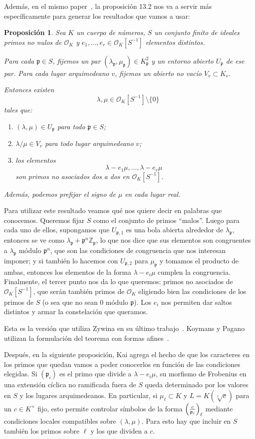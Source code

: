 \documentclass[a4paper]{book}
\theoremstyle{definition}
\theoremstyle{plain}
\newtheorem*{prop*}{Proposición}
\newcommand{\ZZ}{\mathbb{Z}}
\newcommand{\OO}{\mathcal{O}}
\newcommand{\pp}{\mathfrak{p}}
\newcommand{\lp}{\left\lparen}
\newcommand{\rp}{\right\rparen}
\begin{document}
Además, en el mismo paper~\cite{Kai2026Patrones}, la proposición 13.2 nos va a servir más específicamente para generar los resultados que vamos a usar:

\begin{prop*}
Sea $K$ un cuerpo de números, $S$ un conjunto finito de
ideales primos no nulos de $\OO_K$ y
$e_1,\ldots,e_r\in\OO_K[S^{-1}]$ elementos distintos.

Para cada $\pp\in S$, fijemos un par
$(\lambda_{\pp},\mu_{\pp})\in K_{\pp}^2$
y un entorno abierto $U_{\pp}$ de ese par.
Para cada lugar arquimedeano $v$, fijemos un abierto
no vacío $V_v\subset K_v$.

Entonces existen
\[
\lambda,\mu\in\OO_K[S^{-1}]\setminus\{0\}
\]
tales que:
\begin{enumerate}
\item $(\lambda,\mu)\in U_{\pp}$ para todo $\pp\in S$;
\item $\lambda/\mu\in V_v$ para todo lugar arquimedeano $v$;
\item los elementos
\[
\lambda-e_1\mu,\ldots,\lambda-e_r\mu
\]
son primos no asociados dos a dos en $\OO_K[S^{-1}]$.
\end{enumerate}
Además, podemos prefijar el signo de $\mu$ en cada lugar real.
\end{prop*}

Para utilizar este resultado veamos qué nos quiere decir en palabras que conocemos. Queremos fijar $S$ como el conjunto de primos ``malos''. Luego para cada uno de ellos, supongamos que $U_{\pp,1}$ es una bola abierta alrededor de $\lambda_{\pp}$, entonces se ve como $\lambda_\pp + \pp^n \ZZ_\pp$, lo que nos dice que sus elementos son congruentes a $\lambda_\pp$ módulo $\pp^n$, que son las condiciones de congruencia que nos interesan imponer; y si también lo hacemos con $U_{\pp,2}$ para $\mu_\pp$ y tomamos el producto de ambas, entonces los elementos de la forma $\lambda-e_i \mu$ cumplen la congruencia. Finalmente, el tercer punto nos da lo que queremos: primos no asociados de $\OO_K[S^{-1}]$, que serán también primos de $\OO_K$ eligiendo bien las condiciones de los primos de $S$ (o sea que no sean $0$ módulo $\pp$). Los $e_i$ nos permiten dar saltos distintos y armar la constelación que queramos.

Esta es la versión que utiliza Zywina en su último trabajo~\cite{Zywina2026SmallRank}. Koymans y Pagano utilizan la formulación del teorema con formas afines~\cite{KoymansPagano2025}.

Después, en la siguiente proposición, Kai agrega el hecho de que los caracteres en los primos que quedan vamos a poder conocerlos en función de las condiciones elegidas. Si $(\pp_i)$ es el primo que divide a $\lambda-e_i\mu$, su morfismo de Frobenius en una extensión cíclica no ramificada fuera de $S$ queda determinado por los valores en $S$ y los lugares arquimedeanos. En particular, si $\mu_\ell\subset K$ y $L=K(\sqrt[\ell]{c})$ para un $c\in K^\times$ fijo, esto permite controlar símbolos de la forma ${\lp\frac{c}{\pp_i}\rp}_\ell$ mediante condiciones locales compatibles sobre $(\lambda,\mu)$. Para esto hay que incluir en $S$ también los primos sobre $\ell$ y los que dividen a $c$.
\end{document}
